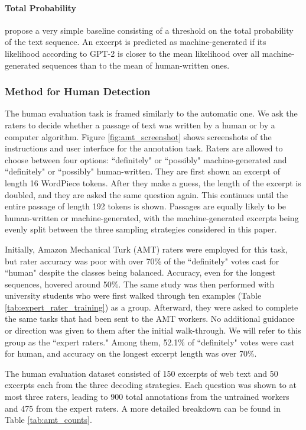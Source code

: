 \paragraph{Total Probability}
\citet{solaiman2019release} propose a very simple baseline consisting of a threshold on the total probability of the text sequence.
An excerpt is predicted as machine-generated if its likelihood according to GPT-2 is closer to the mean likelihood over all machine-generated sequences than to the mean of human-written ones.

\subsubsection{Method for Human Detection}
The human evaluation task is framed similarly to the automatic one.
We ask the raters to decide whether a passage of text was written by a human or by a computer algorithm.
Figure \ref{fig:amt_screenshot} shows screenshots of the instructions and user interface for the annotation task.
Raters are allowed to choose between four options: ``definitely" or ``possibly" machine-generated and  ``definitely" or ``possibly" human-written.
They are first shown an excerpt of length 16 WordPiece tokens.
After they make a guess, the length of the excerpt is doubled, and they are asked the same question again.
This continues until the entire passage of length 192 tokens is shown.
Passages are equally likely to be human-written or machine-generated, with the machine-generated excerpts being evenly split between the three sampling strategies considered in this paper.

Initially, Amazon Mechanical Turk (AMT) raters were employed for this task, but rater accuracy was poor with over 70\% of the ``definitely" votes cast for ``human" despite the classes being balanced.
Accuracy, even for the longest sequences, hovered around 50\%.
The same study was then performed with university students who were first walked through ten examples (Table \ref{tab:expert_rater_training}) as a group.
Afterward, they were asked to complete the same tasks that had been sent to the AMT workers.
No additional guidance or direction was given to them after the initial walk-through.
We will refer to this group as the ``expert raters."
Among them, 52.1\% of ``definitely" votes were cast for human, and accuracy on the longest excerpt length was over 70\%.

The human evaluation dataset consisted of 150 excerpts of web text and 50 excerpts each from the three decoding strategies.
Each question was shown to at most three raters, leading to 900 total annotations from the untrained workers and 475 from the expert raters.
A more detailed breakdown can be found in Table \ref{tab:amt_counts}.



